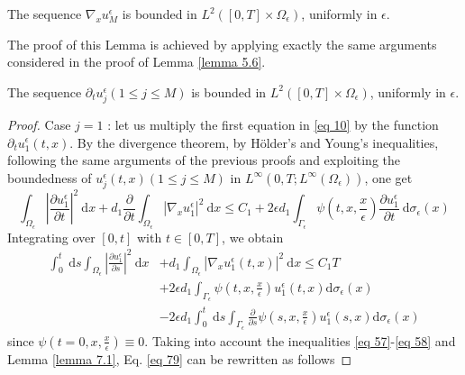 \begin{lemma} The sequence $\nabla_{x} u_{M}^{\epsilon}$ is bounded in $L^{2}\left([0, T] \times \Omega_{\epsilon}\right)$, uniformly in $\epsilon$.
\label{lemma 5.8}\end{lemma}
The proof of  this Lemma is achieved by applying exactly the same arguments considered in the proof of Lemma \eqref{lemma 5.6}.
\begin{lemma} The sequence $\partial_{t} u_{j}^{\epsilon}(1 \leq j \leq M)$ is bounded in $L^{2}\left([0, T] \times \Omega_{\epsilon}\right)$, uniformly in $\epsilon$.
\label{lemma 5.9}\end{lemma}
\begin{proof}
Case $j=1$ : let us multiply the first equation in \eqref{eq 10} by the function $\partial_{t} u_{1}^{\epsilon}(t, x)$. By the divergence theorem, by Hölder's and Young's inequalities, following the same arguments of the previous proofs and exploiting the boundedness of $u_{j}^{\epsilon}(t, x)(1 \leq j \leq M)$ in $L^{\infty}\left(0, T ; L^{\infty}\left(\Omega_{\epsilon}\right)\right)$, one get
\begin{equation}
  \int_{\Omega_{\epsilon}}\left|\frac{\partial u_{1}^{\epsilon}}{\partial t}\right|^{2} \mathrm{~d} x+d_{1} \frac{\partial}{\partial t} \int_{\Omega_{\epsilon}}\left|\nabla_{x} u_{1}^{\epsilon}\right|^{2} \mathrm{~d} x \leq C_{1}+2 \epsilon d_{1} \int_{\Gamma_{\epsilon}} \psi\left(t, x, \frac{x}{\epsilon}\right) \frac{\partial u_{1}^{\epsilon}}{\partial t} \mathrm{~d} \sigma_{\epsilon}(x)
\label{eq 78}\end{equation}
Integrating over $[0, t]$ with $t \in[0, T]$, we obtain
\begin{equation}
  \begin{aligned}
\int_{0}^{t} \mathrm{~d} s \int_{\Omega_{\epsilon}}\left|\frac{\partial u_{1}^{\epsilon}}{\partial s}\right|^{2} \mathrm{~d} x &+d_{1} \int_{\Omega_{\epsilon}}\left|\nabla_{x} u_{1}^{\epsilon}(t, x)\right|^{2} \mathrm{~d} x \leq C_{1} T \\
&+2 \epsilon d_{1} \int_{\Gamma_{\epsilon}} \psi\left(t, x, \frac{x}{\epsilon}\right) u_{1}^{\epsilon}(t, x) \mathrm{d} \sigma_{\epsilon}(x) \\
&-2 \epsilon d_{1} \int_{0}^{t} \mathrm{~d} s \int_{\Gamma_{\epsilon}} \frac{\partial}{\partial s} \psi\left(s, x, \frac{x}{\epsilon}\right) u_{1}^{\epsilon}(s, x) \mathrm{d} \sigma_{\epsilon}(x)
\end{aligned}
\label{eq 79}\end{equation}
since $\psi\left(t=0, x, \frac{x}{\epsilon}\right) \equiv 0$. Taking into account the inequalities \eqref{eq 57}-\eqref{eq 58} and Lemma \eqref{lemma 7.1}, Eq. \eqref{eq 79} can be rewritten as follows

\end{proof}

